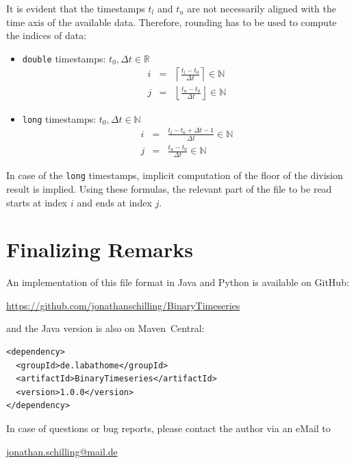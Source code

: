 \documentclass[a4paper,10pt]{article}
\begin{document}
It is evident that the timestamps $t_l$ and $t_u$ are not necessarily aligned with the time axis of the available data.
Therefore, rounding has to be used to compute the indices of data:
\begin{itemize}
  \item \texttt{double} timestamps: $t_0, \Delta t \in \mathbb{R}$
  \begin{eqnarray*}
    i & = & \left\lceil  \frac{t_l - t_0}{\Delta t} \right\rceil  \in \mathbb{N}\\
    j & = & \left\lfloor \frac{t_u - t_0}{\Delta t} \right\rfloor \in \mathbb{N}
  \end{eqnarray*}
  \item \texttt{long} timestamps: $t_0, \Delta t \in \mathbb{N}$
  \begin{eqnarray*}
    i & = & \frac{t_l - t_0 + \Delta t - 1}{\Delta t} \in \mathbb{N}\\
    j & = & \frac{t_u - t_0}{\Delta t} \in \mathbb{N}
  \end{eqnarray*}
\end{itemize}
In case of the \texttt{long} timestamps, implicit computation of the floor of the division result is implied.
Using these formulas, the relevant part of the file to be read starts at index $i$ and ends at index $j$.







\section{Finalizing Remarks}
An implementation of this file format in Java and Python is available on GitHub:
\begin{center}
\href{https://github.com/jonathanschilling/BinaryTimeseries}{https://github.com/jonathanschilling/BinaryTimeseries}
\end{center}
and the Java version is also on Maven~Central:
\begin{verbatim}
<dependency>
  <groupId>de.labathome</groupId>
  <artifactId>BinaryTimeseries</artifactId>
  <version>1.0.0</version>
</dependency>
\end{verbatim}
In case of questions or bug reports, please contact the author via an eMail to
\begin{center}
\href{mailto:jonathan.schilling@mail.de}{jonathan.schilling@mail.de}
\end{center}
\end{document}
